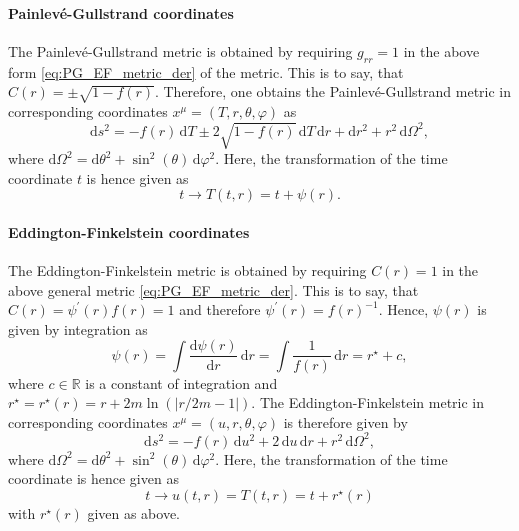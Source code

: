\documentclass[a4paper,11pt]{article}
\numberwithin{equation}{section}
\begin{document}
{\paragraph{Painlevé-Gullstrand coordinates} The Painlevé-Gullstrand metric is obtained by requiring $g_{rr} = 1$ in the above form \cref{eq:PG_EF_metric_der} of the metric. This is to say, that $C(r) = \pm \sqrt{1-f(r)}$. Therefore, one obtains the Painlevé-Gullstrand metric in corresponding coordinates $x^\mu=(T,r,\theta,\varphi)$ as \begin{equation}
\mathrm{d}s^2 = -f(r)\,\mathrm{d}T \pm 2\sqrt{1-f(r)}\,\mathrm{d}T\,\mathrm{d}r + \mathrm{d}r^2 + r^2\,\mathrm{d}\Omega^2, 
\end{equation} where $\mathrm{d}\Omega^2 = \mathrm{d}\theta^2 + \sin^2(\theta)\,\mathrm{d}\varphi^2$. Here, the transformation of the time coordinate $t$ is hence given as \begin{equation}
t\rightarrow T(t,r) = t + \psi(r).
\end{equation}

\paragraph{Eddington-Finkelstein coordinates} The Eddington-Finkelstein metric is obtained by requiring $C(r) = 1$ in the above general metric \cref{eq:PG_EF_metric_der}. This is to say, that $C(r) = \psi^\prime(r)f(r) = 1$ and therefore $\psi^\prime(r) = f(r)^{-1}$. Hence, $\psi(r)$ is given by integration as \begin{equation}
\psi(r) = \int \frac{\mathrm{d}\psi(r)}{\mathrm{d}r}\,\mathrm{d}r = \int \frac{1}{f(r)}\,\mathrm{d}r = r^\star + c,
\end{equation} where $c \in \mathbb{R}$ is a constant of integration and $r^\star = r^\star(r) = r + 2m\ln\left(|r/2m-1|\right)$. The Eddington-Finkelstein metric in corresponding coordinates $x^\mu = (u, r,\theta,\varphi)$ is therefore given by \begin{equation}
\mathrm{d}s^2 = -f(r)\,\mathrm{d}u^2 + 2\,\mathrm{d}u\,\mathrm{d}r +r^2\,\mathrm{d}\Omega^2, 
\end{equation} where $\mathrm{d}\Omega^2 = \mathrm{d}\theta^2 + \sin^2(\theta)\,\mathrm{d}\varphi^2$.
Here, the transformation of the time coordinate is hence given as \begin{equation}
t \rightarrow u(t,r) = T(t,r) = t + r^\star(r)
\end{equation} with $r^\star(r)$ given as above.
}
\end{document}
